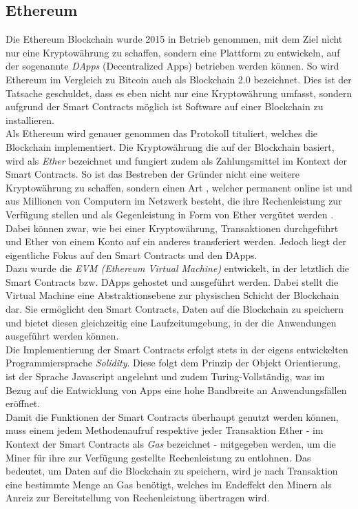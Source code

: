 \subsection{Ethereum}
Die Ethereum Blockchain wurde 2015 in Betrieb genommen, mit dem Ziel nicht nur eine Kryptowährung zu schaffen, sondern eine Plattform zu entwickeln, auf der sogenannte \textit{DApps} (Decentralized Apps) betrieben werden können.
So wird Ethereum im Vergleich zu Bitcoin auch als Blockchain 2.0 bezeichnet. Dies ist der Tatsache geschuldet, dass es eben nicht nur eine Kryptowährung umfasst, sondern aufgrund der Smart Contracts möglich ist Software auf einer Blockchain zu installieren. \\
Als Ethereum wird genauer genommen das Protokoll tituliert, welches die Blockchain implementiert. Die Kryptowährung die auf der Blockchain basiert, wird als \textit{Ether} bezeichnet und fungiert zudem als Zahlungsmittel im Kontext der Smart Contracts. So ist das Bestreben der Gründer nicht eine weitere Kryptowährung zu schaffen, sondern einen Art , welcher permanent online ist und aus Millionen von Computern im Netzwerk besteht, die ihre Rechenleistung zur Verfügung stellen und als Gegenleistung in Form von Ether vergütet werden \cite{BitcoinEthNCo}. \\
Dabei können zwar, wie bei einer Kryptowährung, Transaktionen durchgeführt und Ether von einem Konto auf ein anderes transferiert werden. Jedoch liegt der eigentliche Fokus auf den Smart Contracts und den DApps.\\
Dazu wurde die \textit{EVM (Ethereum Virtual Machine)} entwickelt, in der letztlich die Smart Contracts bzw. DApps gehostet und ausgeführt werden. Dabei stellt die Virtual Machine eine Abstraktionsebene zur physischen Schicht der Blockchain dar. Sie ermöglicht den Smart Contracts, Daten auf die Blockchain zu speichern und bietet diesen gleichzeitig eine Laufzeitumgebung, in der die Anwendungen ausgeführt werden können.\\
Die Implementierung der Smart Contracts erfolgt stets in der eigens entwickelten Programmiersprache \textit{Solidity}. Diese folgt dem Prinzip der Objekt Orientierung, ist der Sprache Javascript angelehnt und zudem Turing-Vollständig, was im Bezug auf die Entwicklung von Apps eine hohe Bandbreite an Anwendungsfällen eröffnet. \\
Damit die Funktionen der Smart Contracts überhaupt genutzt werden können, muss einem jedem Methodenaufruf respektive jeder Transaktion Ether - im Kontext der Smart Contracts als \textit{Gas} bezeichnet - mitgegeben werden, um die Miner für ihre zur Verfügung gestellte Rechenleistung zu entlohnen. Das bedeutet, um Daten auf die Blockchain zu speichern, wird je nach Transaktion eine bestimmte Menge an Gas benötigt, welches im Endeffekt den Minern als Anreiz zur Bereitstellung von Rechenleistung übertragen wird. \\
